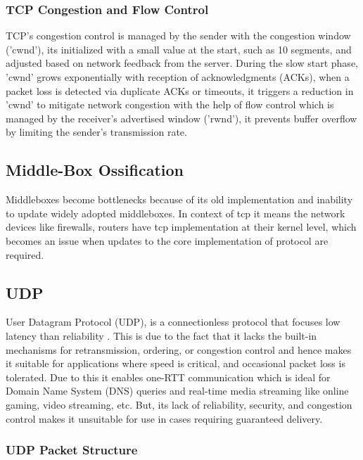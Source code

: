 \subsubsection{TCP Congestion and Flow Control}

TCP’s congestion control is managed by the sender with the congestion window ('cwnd'), its initialized with a small value at the start, such as 10 segments, and adjusted based on network feedback from the server. During the slow start phase, 'cwnd' grows exponentially with reception of acknowledgments (ACKs), when a packet loss is detected via duplicate ACKs or timeouts, it triggers a reduction in 'cwnd' to mitigate network congestion with the help of flow control which is managed by the receiver’s advertised window ('rwnd'), it prevents buffer overflow by limiting the sender’s transmission rate.





\subsection{Middle-Box Ossification}
Middleboxes become bottlenecks because of its old implementation and inability to update widely adopted middleboxes. In context of tcp it means the network devices like firewalls, routers have tcp implementation at their kernel level, which becomes an issue when updates to the core implementation of protocol are required.


\subsection{UDP}

User Datagram Protocol (UDP), is a connectionless protocol that focuses low latency than reliability \cite{kurose2017}. This is due to the fact that it lacks the built-in mechanisms for retransmission, ordering, or congestion control and hence makes it suitable for applications where speed is critical, and occasional packet loss is tolerated. Due to this it enables one-RTT communication which is ideal for Domain Name System (DNS) queries and real-time media streaming like online gaming, video streaming, etc. But, its lack of reliability, security, and congestion control makes it unsuitable for use in cases requiring guaranteed delivery.

\subsubsection{UDP Packet Structure}

